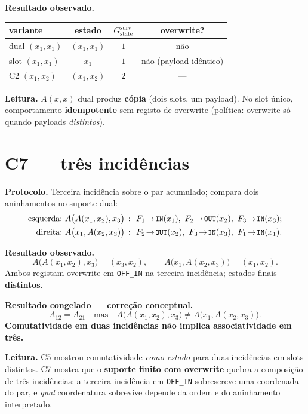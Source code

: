 \documentclass[11pt,a4paper]{article}
\newcommand{\code}[1]{\texttt{\small #1}}
\begin{document}
\medskip\noindent\textbf{Resultado observado.}
\begin{center}\footnotesize
\begin{tabular}{@{}lccc@{}}
\toprule
variante & estado & $G_{\mathrm{state}}^{\mathrm{surv}}$ & overwrite? \\
\midrule
dual $(x_1,x_1)$ & $(x_1,x_1)$ & $1$ & não \\
slot $(x_1,x_1)$ & $x_1$ & $1$ & não (payload idêntico) \\
C2 $(x_1,x_2)$ & $(x_1,x_2)$ & $2$ & --- \\
\bottomrule
\end{tabular}
\end{center}

\medskip\noindent\textbf{Leitura.} $A(x,x)$ dual produz \textbf{cópia} (dois slots,
um payload). No slot único, comportamento \textbf{idempotente} sem registo de overwrite
(política: overwrite só quando payloads \emph{distintos}).

\section{C7 --- três incidências}\label{comb:c7}

\noindent\textbf{Protocolo.} Terceira incidência sobre o par acumulado; compara
dois aninhamentos no suporte dual:
\begin{align*}
\text{esquerda:}\ &A\bigl(A(x_1,x_2),x_3\bigr)
\ \colon\ F_1\!\to\!\code{IN}(x_1),\ F_2\!\to\!\code{OUT}(x_2),\ F_3\!\to\!\code{IN}(x_3);\\
\text{direita:}\ &A\bigl(x_1,A(x_2,x_3)\bigr)
\ \colon\ F_2\!\to\!\code{OUT}(x_2),\ F_3\!\to\!\code{IN}(x_3),\ F_1\!\to\!\code{IN}(x_1).
\end{align*}

\medskip\noindent\textbf{Resultado observado.}
\[
A\bigl(A(x_1,x_2),x_3\bigr)=(x_3,x_2),
\qquad
A\bigl(x_1,A(x_2,x_3)\bigr)=(x_1,x_2).
\]
Ambos registam overwrite em \code{OFF\_IN} na terceira incidência; estados finais
\textbf{distintos}.

\medskip\noindent\textbf{Resultado congelado --- correção conceptual.}
\[
\boxed{
A_{12}=A_{21}
\quad\text{mas}\quad
A\bigl(A(x_1,x_2),x_3\bigr)\neq A\bigl(x_1,A(x_2,x_3)\bigr).
}
\]
\textbf{Comutatividade em duas incidências não implica associatividade em três.}

\medskip\noindent\textbf{Leitura.} C5 mostrou comutatividade \emph{como estado} para
duas incidências em slots distintos. C7 mostra que o \textbf{suporte finito com
overwrite} quebra a composição de três incidências: a terceira incidência em
\code{OFF\_IN} sobrescreve uma coordenada do par, e \emph{qual} coordenatura
sobrevive depende da ordem e do aninhamento interpretado.
\end{document}
